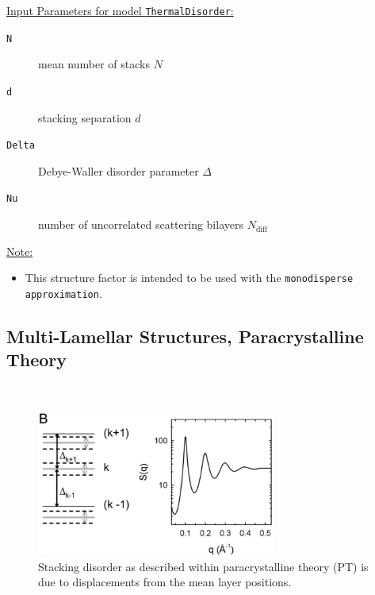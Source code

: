 \vspace{5mm}

\noindent
\underline{Input Parameters for model \texttt{ThermalDisorder}:}
\begin{description}
\item[\texttt{N}] mean number of stacks $N$
\item[\texttt{d}] stacking separation $d$
\item[\texttt{Delta}]  Debye-Waller disorder parameter $\Delta$
\item[\texttt{Nu}]   number of uncorrelated scattering bilayers $N_\text{diff}$
\end{description}

\noindent\underline{Note:}
\begin{itemize}
\item This structure factor is intended to be used with the \texttt{monodisperse approximation}.
\end{itemize}


\clearpage
\subsection{Multi-Lamellar Structures, Paracrystalline Theory} ~\\

\begin{figure}[htb]
\begin{center}
\includegraphics[width=0.7\textwidth,height=0.4\textwidth]{ParacrystallineTheorySQ.png}
\end{center}
\caption{Stacking disorder as described within paracrystalline
theory (PT) is due to displacements from the mean layer
positions.} \label{ParacrystallineTheorySQ}
\end{figure}


